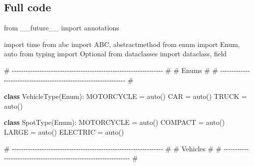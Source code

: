 \documentclass[11pt]{article}
\newenvironment{Shaded}{\begin{snugshade}}{\end{snugshade}}
\newcommand{\CommentTok}[1]{\textcolor[rgb]{0.48,0.49,0.49}{#1}}
\newcommand{\ImportTok}[1]{\textcolor[rgb]{0.15,0.68,0.38}{#1}}
\newcommand{\KeywordTok}[1]{\textcolor[rgb]{0.81,0.81,0.76}{\textbf{#1}}}
\newcommand{\NormalTok}[1]{\textcolor[rgb]{0.81,0.81,0.76}{#1}}
\newcommand{\OperatorTok}[1]{\textcolor[rgb]{0.81,0.81,0.76}{#1}}
\begin{document}
\subsection{Full code}\label{full-code-1}


\begin{Shaded}
\begin{Highlighting}[]
\ImportTok{from}\NormalTok{ \_\_future\_\_ }\ImportTok{import}\NormalTok{ annotations}

\ImportTok{import}\NormalTok{ time}
\ImportTok{from}\NormalTok{ abc }\ImportTok{import}\NormalTok{ ABC, abstractmethod}
\ImportTok{from}\NormalTok{ enum }\ImportTok{import}\NormalTok{ Enum, auto}
\ImportTok{from}\NormalTok{ typing }\ImportTok{import}\NormalTok{ Optional}
\ImportTok{from}\NormalTok{ dataclasses }\ImportTok{import}\NormalTok{ dataclass, field}


\CommentTok{\# {-}{-}{-}{-}{-}{-}{-}{-}{-}{-}{-}{-}{-}{-}{-}{-}{-}{-}{-}{-}{-}{-}{-}{-}{-}{-}{-}{-}{-}{-}{-}{-}{-}{-}{-}{-}{-}{-}{-}{-}{-}{-}{-}{-}{-}{-}{-}{-}{-}{-}{-}{-}{-}{-}{-}{-}{-}{-}{-}{-}{-}{-}{-}{-}{-}{-} \#}
\CommentTok{\# Enums                                                               \#}
\CommentTok{\# {-}{-}{-}{-}{-}{-}{-}{-}{-}{-}{-}{-}{-}{-}{-}{-}{-}{-}{-}{-}{-}{-}{-}{-}{-}{-}{-}{-}{-}{-}{-}{-}{-}{-}{-}{-}{-}{-}{-}{-}{-}{-}{-}{-}{-}{-}{-}{-}{-}{-}{-}{-}{-}{-}{-}{-}{-}{-}{-}{-}{-}{-}{-}{-}{-}{-} \#}

\KeywordTok{class}\NormalTok{ VehicleType(Enum):}
\NormalTok{    MOTORCYCLE }\OperatorTok{=}\NormalTok{ auto()}
\NormalTok{    CAR }\OperatorTok{=}\NormalTok{ auto()}
\NormalTok{    TRUCK }\OperatorTok{=}\NormalTok{ auto()}


\KeywordTok{class}\NormalTok{ SpotType(Enum):}
\NormalTok{    MOTORCYCLE }\OperatorTok{=}\NormalTok{ auto()}
\NormalTok{    COMPACT }\OperatorTok{=}\NormalTok{ auto()}
\NormalTok{    LARGE }\OperatorTok{=}\NormalTok{ auto()}
\NormalTok{    ELECTRIC }\OperatorTok{=}\NormalTok{ auto()}


\CommentTok{\# {-}{-}{-}{-}{-}{-}{-}{-}{-}{-}{-}{-}{-}{-}{-}{-}{-}{-}{-}{-}{-}{-}{-}{-}{-}{-}{-}{-}{-}{-}{-}{-}{-}{-}{-}{-}{-}{-}{-}{-}{-}{-}{-}{-}{-}{-}{-}{-}{-}{-}{-}{-}{-}{-}{-}{-}{-}{-}{-}{-}{-}{-}{-}{-}{-}{-} \#}
\CommentTok{\# Vehicles                                                            \#}
\CommentTok{\# {-}{-}{-}{-}{-}{-}{-}{-}{-}{-}{-}{-}{-}{-}{-}{-}{-}{-}{-}{-}{-}{-}{-}{-}{-}{-}{-}{-}{-}{-}{-}{-}{-}{-}{-}{-}{-}{-}{-}{-}{-}{-}{-}{-}{-}{-}{-}{-}{-}{-}{-}{-}{-}{-}{-}{-}{-}{-}{-}{-}{-}{-}{-}{-}{-}{-} \#}


\end{Highlighting}
\end{Shaded}
\end{document}
